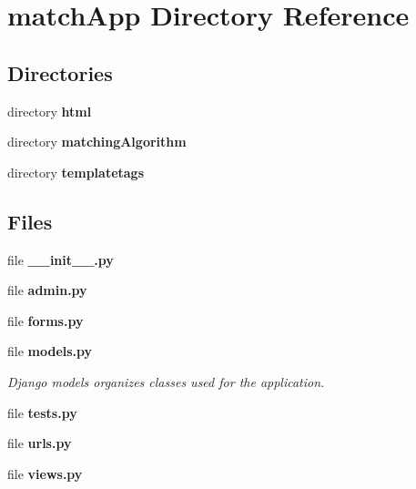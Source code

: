 \section{match\+App Directory Reference}
\label{dir_9f08404d5ea9049102ae5171ed7678aa}
\subsection*{Directories}
\begin{DoxyCompactItemize}
\item 
directory {\bf html}
\item 
directory {\bf matching\+Algorithm}
\item 
directory {\bf templatetags}
\end{DoxyCompactItemize}
\subsection*{Files}
\begin{DoxyCompactItemize}
\item 
file {\bf \+\_\+\+\_\+init\+\_\+\+\_\+.\+py}
\item 
file {\bf admin.\+py}
\item 
file {\bf forms.\+py}
\item 
file {\bf models.\+py}
\begin{DoxyCompactList}\small\item\em Django models organizes classes used for the application. \end{DoxyCompactList}\item 
file {\bf tests.\+py}
\item 
file {\bf urls.\+py}
\item 
file {\bf views.\+py}
\end{DoxyCompactItemize}
